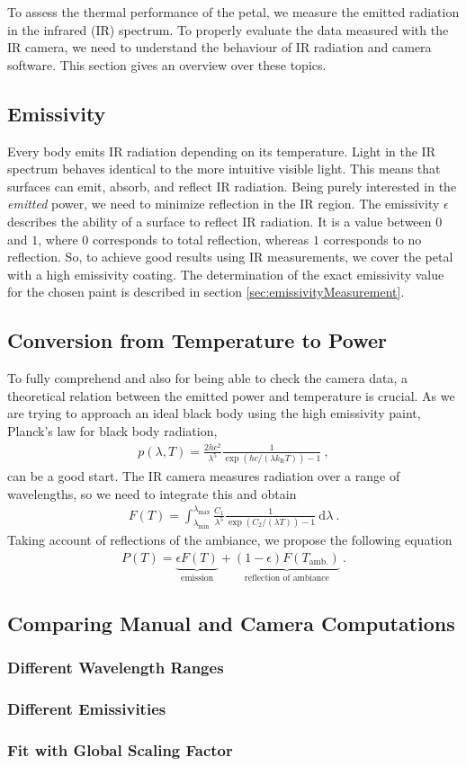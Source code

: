 To assess the thermal performance of the petal, we measure the emitted radiation in the infrared (IR) spectrum. To properly evaluate the data measured with the IR camera, we need to understand the behaviour of IR radiation and camera software. This section gives an overview over these topics.
\subsection{Emissivity}
Every body emits IR radiation depending on its temperature. Light in the IR spectrum behaves identical to the more intuitive visible light. This means that surfaces can emit, absorb, and reflect IR radiation. Being purely interested in the \textit{emitted} power, we need to minimize reflection in the IR region. The emissivity $\epsilon$ describes the ability of a surface to reflect IR radiation.  It is a value between $0$ and $1$, where $0$ corresponds to total reflection, whereas $1$ corresponds to no reflection. So, to achieve good results using IR measurements, we cover the petal with a high emissivity coating. The determination of the exact emissivity value for the chosen paint is described in section \ref{sec:emissivityMeasurement}.


\subsection{Conversion from Temperature to Power\label{sec:theory}}
To fully comprehend and also for being able to check the camera data, a theoretical relation between the emitted power and temperature is crucial. As we are trying to approach an ideal black body using the high emissivity paint, Planck's law for black body radiation,
\begin{align}
	p(\lambda, T) = \frac{2hc^2}{\lambda^5}\frac{1}{\exp\left(hc/(\lambda k_\text{B}T)\right)-1} \ ,
\end{align}
can be a good start.  The IR camera measures radiation over a range of wavelengths, so we need to integrate this and obtain
\begin{align}
	F(T) = \int_{\lambda_\text{min}}^{\lambda_\text{max}}\frac{C_1}{\lambda^5}\frac{1}{\exp\left(C_2/(\lambda T)\right)-1}\ \text{d}\lambda \ .
\end{align}
Taking account of reflections of the ambiance, we propose the following equation
\begin{align}\label{eq:powerTemp}
	P(T) = \underbrace{\epsilon F(T)}_\text{emission} + \underbrace{(1-\epsilon)F(T_\text{amb.})}_\text{reflection of ambiance} \ .
\end{align}

\subsection{Comparing Manual and Camera Computations}
\subsubsection{Different Wavelength Ranges}
\subsubsection{Different Emissivities}
\subsubsection{Fit with Global Scaling Factor}
\clearpage